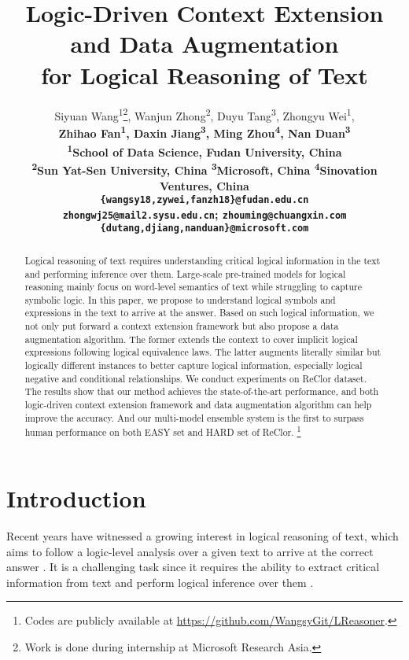 \documentclass[11pt,a4paper]{article}
\title{Logic-Driven Context Extension and Data Augmentation \\ for Logical Reasoning of Text}
\author{Siyuan Wang\textsuperscript{\rm 1}\thanks{Work is done during internship at Microsoft Research Asia.}, Wanjun Zhong\textsuperscript{\rm 2}, Duyu Tang\textsuperscript{\rm 3}, Zhongyu Wei\textsuperscript{\rm 1}, \\ \bf Zhihao Fan\textsuperscript{\rm 1}, Daxin Jiang\textsuperscript{\rm 3}, Ming Zhou\textsuperscript{\rm 4}, Nan Duan\textsuperscript{\rm 3}  \\
  \textsuperscript{\rm 1}School of Data Science, Fudan University, China \\
  \textsuperscript{\rm 2}Sun Yat-Sen University, China \textsuperscript{\rm 3}Microsoft, China
  \textsuperscript{\rm 4}Sinovation Ventures, China \\
  \texttt{\{wangsy18,zywei,fanzh18\}@fudan.edu.cn} \\
  \texttt{zhongwj25@mail2.sysu.edu.cn}; \texttt{zhouming@chuangxin.com} \\
  \texttt{\{dutang,djiang,nanduan\}@microsoft.com} \\
}
\date{}
\begin{document}
\maketitle
\begin{abstract}
Logical reasoning of text requires understanding critical logical information in the text and performing inference over them. Large-scale pre-trained models for logical reasoning mainly focus on word-level semantics of text while struggling to capture symbolic logic. In this paper, we propose to understand logical symbols and expressions in the text to arrive at the answer. Based on such logical information, we not only put forward a context extension framework but also propose a data augmentation algorithm. The former extends the context to cover implicit logical expressions following logical equivalence laws. The latter augments literally similar but logically different instances to better capture logical information, especially logical negative and conditional relationships.
We conduct experiments on ReClor dataset. The results show that our method achieves the state-of-the-art performance, and both logic-driven context extension framework and data augmentation algorithm can help improve the accuracy. And our multi-model ensemble system is the first to surpass human performance on both EASY set and HARD set of ReClor. \footnote{Codes are publicly available at \url{https://github.com/WangsyGit/LReasoner}.} 
\end{abstract}


\section{Introduction}


Recent years have witnessed a growing interest in logical reasoning of text, which aims to follow a logic-level analysis over a given text to arrive at the correct answer \cite{mccarthy1989artificial, nilsson1991logic}.
It is a challenging task since it requires the ability to extract critical information from text and perform logical inference over them \cite{williams2018broad, habernal2018argument, liu2020logiqa}.
\end{document}
